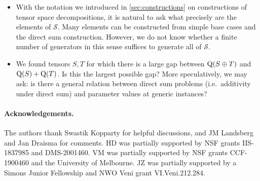 \documentclass[10pt,a4paper]{article}
\theoremstyle{definition}
\theoremstyle{remark}
\newcommand{\subrank}{{\rm Q}}
\begin{document}
\begin{itemize}
    \item With the notation we introduced in \autoref{sec:constructions} on constructions of tensor space decompositions, it is natural to ask what precisely are the elements of $\mathcal{S}$. Many elements can be constructed from simple base cases and the direct sum construction. However, we do not know whether a finite number of generators in this sense suffices to generate all of $\mathcal{S}$.
    \item We found tensors $S,T$ for which there is a large gap between $\subrank(S \oplus T)$ and $\subrank(S) + \subrank(T)$. Is this the largest possible gap? More speculatively, we may ask: is there a general relation between direct sum problems (i.e.~additivity under direct sum) and parameter values at generic instances?
\end{itemize}


\paragraph{Acknowledgements.}
The authors thank Swastik Kopparty for helpful discussions, and JM Landsberg and Jan Draisma for comments.
HD was partially supported by NSF grants IIS-1837985 and DMS-2001460. VM was partially supported by NSF grants CCF-1900460 and the University of Melbourne.
JZ was partially supported by a Simons Junior Fellowship and NWO Veni grant VI.Veni.212.284.
\end{document}
